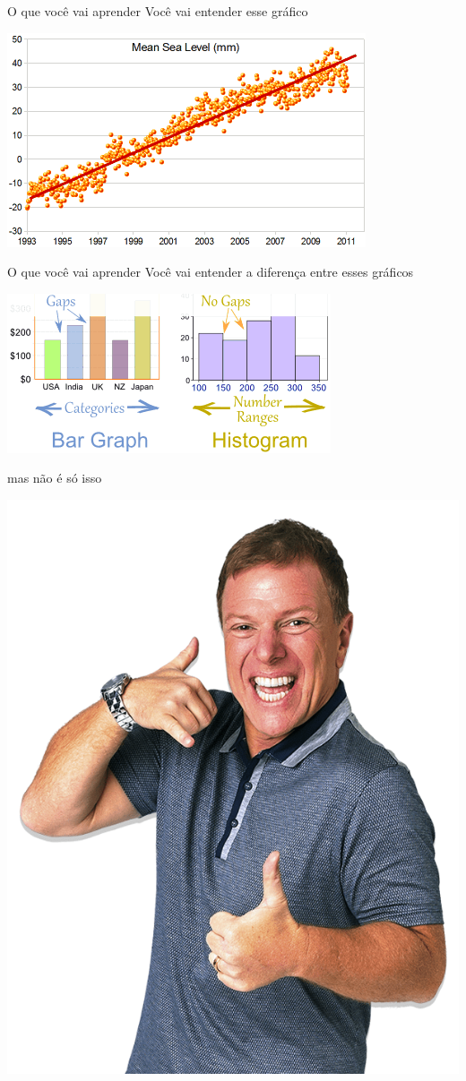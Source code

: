 \documentclass{beamer}
\begin{document}
\begin{frame}{O que você vai aprender}
    Você vai entender esse gráfico

    \bigskip
  \begin{center}
    \includegraphics[width=.7\textwidth]{Intro/mean-sea-level-line}
  \end{center}
\end{frame}

\begin{frame}{O que você vai aprender}
    Você vai entender a diferença entre esses gráficos

    \bigskip
  \begin{center}
    \includegraphics[width=.7\textwidth]{Intro/bar-chart-vs-histogram}
  \end{center}
\end{frame}

\begin{frame}{mas não é só isso}
  \begin{center}
    \includegraphics[width=.7\textwidth]{Intro/bottini}
  \end{center}
\end{frame}
\end{document}
